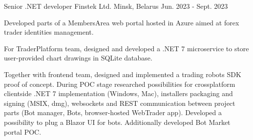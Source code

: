 

\begin{cventries}

  \cventry
    {Senior .NET developer} %
    {Finstek Ltd.} %
    {Minsk, Belarus} %
    {Jun. 2023 - Sept. 2023} %
    {
      \begin{cvitems} %
        \item {Developed parts of a MembersArea web portal hosted in Azure aimed at forex trader identities management.}
        \item {For TraderPlatform team, designed and developed a .NET 7 microservice to store user-provided chart drawings in SQLite database.}
        \item {Together with frontend team, designed and implemented a trading robots SDK proof of concept. During POC stage researched possibilities for crossplatform clientside .NET 7 implementation (Windows, Mac), installers packaging and signing (MSIX, dmg), websockets and REST communication between project parts (Bot manager, Bots, browser-hosted WebTrader app). Developed a possibility to plug a Blazor UI for bots. Additionally developed Bot Market portal POC.}
      \end{cvitems}
    }


\end{cventries}
